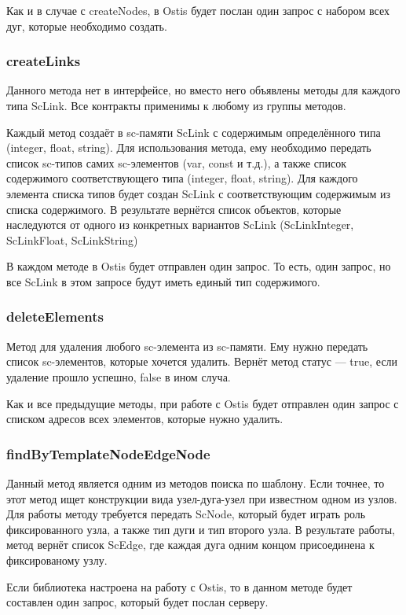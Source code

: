 Как и в случае с createNodes, в Ostis будет послан один запрос с набором всех дуг, которые необходимо создать. 

\subsubsection{createLinks}
Данного метода нет в интерфейсе, но вместо него объявлены методы для каждого типа ScLink. Все контракты применимы к любому из группы методов. 

Каждый метод создаёт в sc-памяти ScLink с содержимым определённого типа (integer, float, string). Для использования метода, ему необходимо передать список sc-типов самих sc-элементов (var, const и т.д.), а также список содержимого соответствующего типа (integer, float, string). Для каждого элемента списка типов будет создан ScLink с соответствующим содержимым из списка содержимого. В результате вернётся список объектов, которые наследуются от одного из конкретных вариантов ScLink (ScLinkInteger, ScLinkFloat, ScLinkString)

В каждом методе в Ostis будет отправлен один запрос. То есть, один запрос, но все ScLink в этом запросе будут иметь единый тип содержимого. 

\subsubsection{deleteElements}
Метод для удаления любого sc-элемента из sc-памяти. Ему нужно передать список sc-элементов, которые хочется удалить. Вернёт метод статус --- true, если удаление прошло успешно, false в ином случа. 

Как и все предыдущие методы, при работе с Ostis будет отправлен один запрос с списком адресов всех элементов, которые нужно удалить. 

\subsubsection{findByTemplateNodeEdgeNode}
Данный метод является одним из методов поиска по шаблону. Если точнее, то этот метод ищет конструкции вида узел-дуга-узел при известном одном из узлов. Для работы методу требуется передать ScNode, который будет играть роль фиксированного узла, а также тип дуги и тип второго узла. В результате работы, метод вернёт список ScEdge, где каждая дуга одним концом присоединена к фиксированому узлу. 

Если библиотека настроена на работу с Ostis, то в данном методе будет составлен один запрос, который будет послан серверу. 

